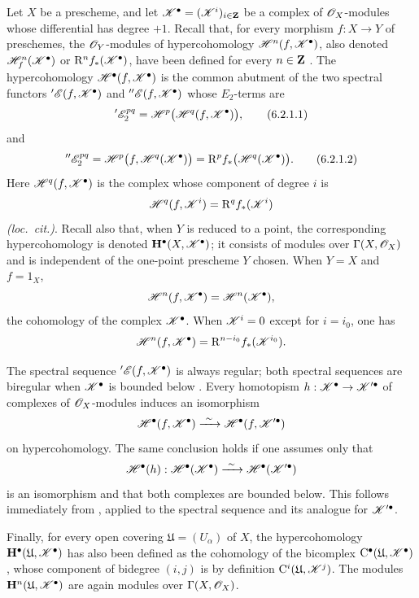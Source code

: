 \begin{env}[6.2.1]
\label{III.6.2.1}
Let $X$ be a prescheme, and let
$\mathscr{K}^\bullet=(\mathscr{K}^i)_{i\in\mathbf{Z}}$ be a complex of
$\mathscr{O}_X$-modules whose differential has degree $+1$.
Recall that, for every morphism $f:X\to Y$ of preschemes, the
$\mathscr{O}_Y$-modules of hypercohomology
$\mathscr{H}^n(f,\mathscr{K}^\bullet)$, also denoted
$\mathscr{H}_f^n(\mathscr{K}^\bullet)$ or
$\mathrm{R}^n f_*(\mathscr{K}^\bullet)$, have been defined for every
$n\in\mathbf{Z}$ .  The hypercohomology
$\mathscr{H}^\bullet(f,\mathscr{K}^\bullet)$ is the common abutment of
the two spectral functors
$'\mathscr{E}(f,\mathscr{K}^\bullet)$ and
$''\mathscr{E}(f,\mathscr{K}^\bullet)$ whose $E_2$-terms are
\[
  '\mathscr{E}_2^{pq}
  =
  \mathscr{H}^p\bigl(\mathscr{H}^q(f,\mathscr{K}^\bullet)\bigr),
  \tag{6.2.1.1}\label{III.6.2.1.1}
\]
and
\[
  ''\mathscr{E}_2^{pq}
  =
  \mathscr{H}^p\bigl(f,\mathscr{H}^q(\mathscr{K}^\bullet)\bigr)
  =
  \mathrm{R}^p f_*\bigl(\mathscr{H}^q(\mathscr{K}^\bullet)\bigr).
  \tag{6.2.1.2}\label{III.6.2.1.2}
\]
Here $\mathscr{H}^q(f,\mathscr{K}^\bullet)$ is the complex whose component
of degree $i$ is
\[
  \mathscr{H}^q(f,\mathscr{K}^i)=\mathrm{R}^q f_*(\mathscr{K}^i)
\]
\emph{(loc.\ cit.)}.  Recall also that, when $Y$ is reduced to a
point, the corresponding hypercohomology is denoted
$\mathbf{H}^\bullet(X,\mathscr{K}^\bullet)$; it consists of modules
over $\Gamma(X,\mathscr{O}_X)$ and is independent of the one-point
prescheme $Y$ chosen.  When $Y=X$ and $f=1_X$,
\[
  \mathscr{H}^n(f,\mathscr{K}^\bullet)
  =
  \mathscr{H}^n(\mathscr{K}^\bullet),
\]
the cohomology of the complex $\mathscr{K}^\bullet$.  When
$\mathscr{K}^i=0$ except for $i=i_0$, one has
\[
  \mathscr{H}^n(f,\mathscr{K}^\bullet)
  =
  \mathrm{R}^{n-i_0}f_*(\mathscr{K}^{i_0}).
\]

The spectral sequence $'\mathscr{E}(f,\mathscr{K}^\bullet)$ is always
regular; both spectral sequences are biregular when
$\mathscr{K}^\bullet$ is bounded below .
Every homotopism
$h:\mathscr{K}^\bullet\to\mathscr{K}'^\bullet$ of complexes of
$\mathscr{O}_X$-modules  induces an isomorphism
\[
  \mathscr{H}^\bullet(f,\mathscr{K}^\bullet)
  \xrightarrow{\ \sim\ }
  \mathscr{H}^\bullet(f,\mathscr{K}'^\bullet)
\]
on hypercohomology.  The same conclusion holds if one assumes only
that
\[
  \mathscr{H}^\bullet(h):
  \mathscr{H}^\bullet(\mathscr{K}^\bullet)
  \xrightarrow{\ \sim\ }
  \mathscr{H}^\bullet(\mathscr{K}'^\bullet)
\]
is an isomorphism and that both complexes are bounded below.  This
follows immediately from , applied to the
spectral sequence  and its analogue for
$\mathscr{K}'^\bullet$.

Finally, for every open covering
$\mathfrak{U}=(U_\alpha)$ of $X$, the hypercohomology
$\mathbf{H}^\bullet(\mathfrak{U},\mathscr{K}^\bullet)$ has also been
defined  as the cohomology of the bicomplex
$\mathrm{C}^\bullet(\mathfrak{U},\mathscr{K}^\bullet)$, whose component
of bidegree $(i,j)$ is by definition
$\mathrm{C}^i(\mathfrak{U},\mathscr{K}^j)$.  The modules
$\mathbf{H}^n(\mathfrak{U},\mathscr{K}^\bullet)$ are again modules over
$\Gamma(X,\mathscr{O}_X)$.
\end{env}

